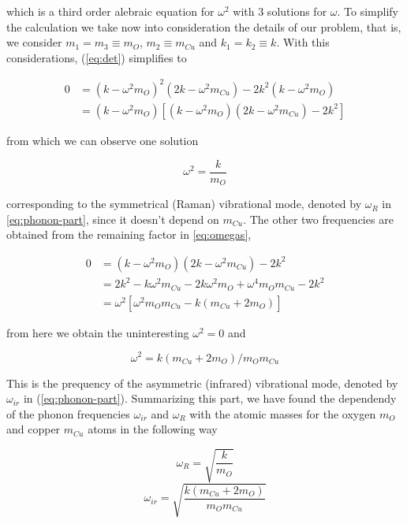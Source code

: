 \noindent which is a third order alebraic equation for $\omega^2$ with 3 solutions for $\omega$.
To simplify the calculation we take now into consideration the details of our problem, that is, we consider $m_1 = m_3 \equiv m_O$, $m_2 \equiv m_{Cu}$ and $k_1 = k_2 \equiv k$. 
With this considerations, (\ref{eq:det}) simplifies to

\begin{align}\label{eq:omegas}
0 & = (k-\omega^2m_O)^2(2k-\omega^2m_{Cu})-2k^2(k-\omega^2m_O) \\
  & = (k-\omega^2m_O)[(k-\omega^2m_O)(2k-\omega^2m_{Cu})-2k^2]
\end{align}

\noindent from which we can observe one solution

\begin{equation}
\omega^2= \frac{k}{m_O}
\end{equation}

\noindent corresponding to the symmetrical (Raman) vibrational mode, denoted by $\omega_{R}$ in \ref{eq:phonon-part}, since it doesn't depend on $m_{Cu}$.
The other two frequencies are obtained from the remaining factor in \ref{eq:omegas},

\begin{equation}
\begin{split}
0 & = (k-\omega^2m_O)(2k-\omega^2m_{Cu})-2k^2 \\
  & = 2k^2-k\omega^2m_{Cu}-2k\omega^2m_O+\omega^4m_Om_{Cu}-2k^2 \\
  & = \omega^2[\omega^2m_Om_{Cu}-k(m_{Cu}+2m_O)]
\end{split}
\end{equation}

\noindent from here we obtain the uninteresting $\omega^2=0$ and

\begin{equation}
\omega^2 = k(m_{Cu}+2m_O)/m_Om_{Cu}
\end{equation}

This is the prequency of the asymmetric (infrared) vibrational mode, denoted by $\omega_{ir}$ in (\ref{eq:phonon-part}).
Summarizing this part, we have found the dependendy of the phonon frequencies $\omega_{ir}$ and $\omega_R$ with the atomic masses for the oxygen $m_O$ and copper $m_{Cu}$ atoms in the following way

\begin{equation}\label{eq:omegaR}
\omega_{R}= \sqrt{\frac{k}{m_O}}
\end{equation}
\begin{equation}\label{eq:omegair}
\omega_{ir} = \sqrt{\frac{k(m_{Cu}+2m_O)}{m_Om_{Cu}}}
\end{equation}

